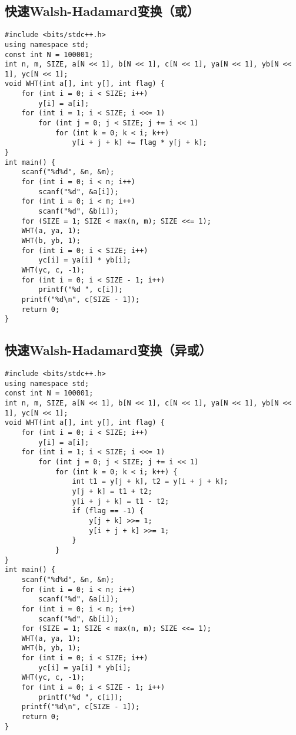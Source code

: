 \documentclass[a4paper]{article}
\begin{document}
\subsection{快速Walsh-Hadamard变换（或）}
\begin{lstlisting}
#include <bits/stdc++.h>
using namespace std;
const int N = 100001;
int n, m, SIZE, a[N << 1], b[N << 1], c[N << 1], ya[N << 1], yb[N << 1], yc[N << 1];
void WHT(int a[], int y[], int flag) {
    for (int i = 0; i < SIZE; i++)
        y[i] = a[i];
    for (int i = 1; i < SIZE; i <<= 1)
        for (int j = 0; j < SIZE; j += i << 1)
            for (int k = 0; k < i; k++)
                y[i + j + k] += flag * y[j + k];
}
int main() {
    scanf("%d%d", &n, &m);
    for (int i = 0; i < n; i++)
        scanf("%d", &a[i]);
    for (int i = 0; i < m; i++)
        scanf("%d", &b[i]);
    for (SIZE = 1; SIZE < max(n, m); SIZE <<= 1);
    WHT(a, ya, 1);
    WHT(b, yb, 1);
    for (int i = 0; i < SIZE; i++)
        yc[i] = ya[i] * yb[i];
    WHT(yc, c, -1);
    for (int i = 0; i < SIZE - 1; i++)
        printf("%d ", c[i]);
    printf("%d\n", c[SIZE - 1]);
    return 0;
}
\end{lstlisting}
\subsection{快速Walsh-Hadamard变换（异或）}
\begin{lstlisting}
#include <bits/stdc++.h>
using namespace std;
const int N = 100001;
int n, m, SIZE, a[N << 1], b[N << 1], c[N << 1], ya[N << 1], yb[N << 1], yc[N << 1];
void WHT(int a[], int y[], int flag) {
    for (int i = 0; i < SIZE; i++)
        y[i] = a[i];
    for (int i = 1; i < SIZE; i <<= 1)
        for (int j = 0; j < SIZE; j += i << 1)
            for (int k = 0; k < i; k++) {
                int t1 = y[j + k], t2 = y[i + j + k];
                y[j + k] = t1 + t2;
                y[i + j + k] = t1 - t2;
                if (flag == -1) {
                    y[j + k] >>= 1;
                    y[i + j + k] >>= 1;
                }
            }
}
int main() {
    scanf("%d%d", &n, &m);
    for (int i = 0; i < n; i++)
        scanf("%d", &a[i]);
    for (int i = 0; i < m; i++)
        scanf("%d", &b[i]);
    for (SIZE = 1; SIZE < max(n, m); SIZE <<= 1);
    WHT(a, ya, 1);
    WHT(b, yb, 1);
    for (int i = 0; i < SIZE; i++)
        yc[i] = ya[i] * yb[i];
    WHT(yc, c, -1);
    for (int i = 0; i < SIZE - 1; i++)
        printf("%d ", c[i]);
    printf("%d\n", c[SIZE - 1]);
    return 0;
}
\end{lstlisting}
\end{document}
